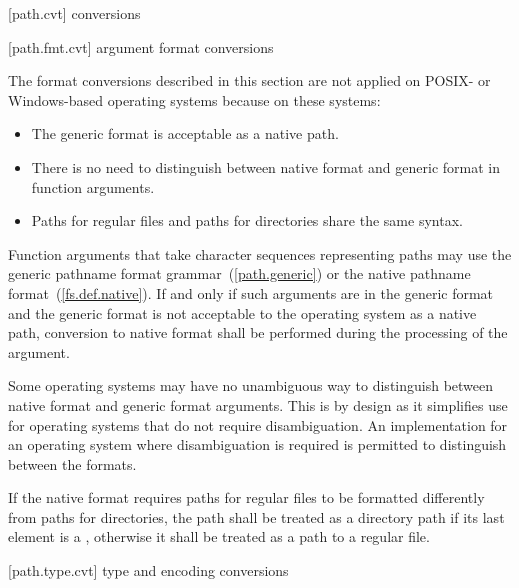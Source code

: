 [path.cvt]{ conversions}

[path.fmt.cvt]{ argument format conversions}

\pnum
\begin{note}
The format conversions described in this section
are not applied on POSIX- or Windows-based operating systems
because on these systems:
\begin{itemize}
\item The generic format is acceptable as a native path.
\item There is no need to distinguish between native format and generic format in function arguments.
\item Paths for regular files and paths for directories share the same syntax.
\end{itemize}
\end{note}

\pnum
Function arguments that take character sequences representing
paths may use the generic pathname format grammar~(\ref{path.generic}) or
the native pathname format~(\ref{fs.def.native}). If and only if such
arguments are in the generic format and the generic format is not acceptable to
the operating system as a native path, conversion to native format shall be
performed during the processing of the argument.

\pnum
\begin{note}
Some operating systems may have no unambiguous way to distinguish between native format and generic format arguments.
This is by design as it simplifies use for operating systems that do not require
disambiguation. An implementation for an operating system where disambiguation
is required is permitted to distinguish between the formats.
\end{note}

\pnum
If the native format requires paths for regular files to be formatted
differently from paths for directories, the path shall be treated as a directory
path if its last element is a ,
otherwise it shall be treated as a path to a regular file.

[path.type.cvt]{ type and encoding conversions}

